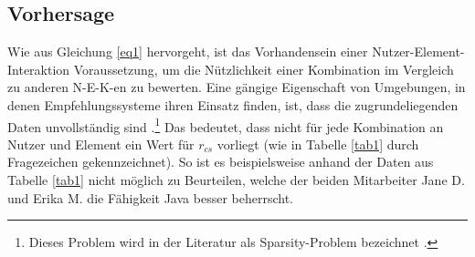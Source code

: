 \subsection{Vorhersage}
\label{ch:empfehlungssysteme:empfehlungserstellung:prediction}
Wie aus Gleichung \ref{eq1} hervorgeht, ist das Vorhandensein einer Nutzer-Ele\-ment-Interaktion Voraussetzung, um die Nützlichkeit einer Kombination im Vergleich zu anderen \ac{N-E-K}-en zu bewerten.
Eine gängige Eigenschaft von Umgebungen, in denen Empfehlungssysteme ihren Einsatz finden, ist, dass die zugrundeliegenden Daten unvollständig sind \cite[S. 735]{adomavicius:inproceedings}.\footnote{Dieses Problem wird in der Literatur als Sparsity-Problem bezeichnet \cite[S. 61]{ning:inbook}.}
Das bedeutet, dass nicht für jede Kombination an Nutzer und Element ein Wert für $r_{cs}$ vorliegt (wie in Tabelle \ref{tab1} durch Fragezeichen gekennzeichnet).
So ist es beispielsweise anhand der Daten aus Tabelle \ref{tab1} nicht möglich zu Beurteilen, welche der beiden Mitarbeiter Jane D. und Erika M. die Fähigkeit Java besser beherrscht.

